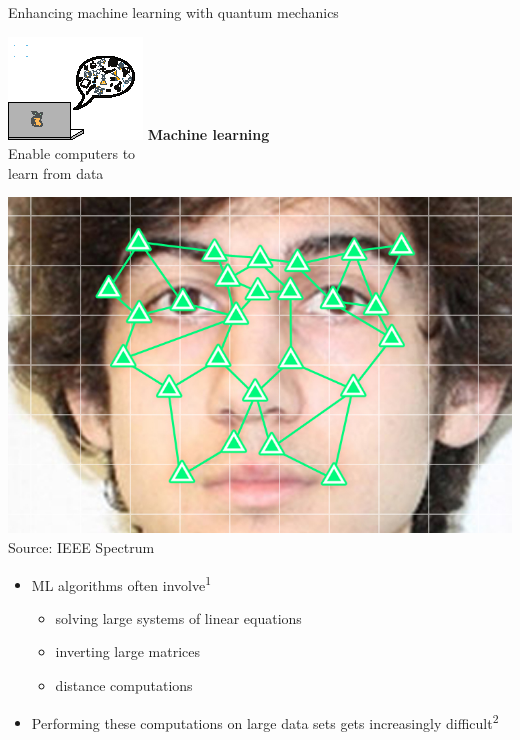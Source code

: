 \documentclass[10pt]{beamer}
\begin{document}
{
\begin{frame}[fragile]{Enhancing machine learning with quantum mechanics}

\begin{minipage}[c]{0.45\textwidth}
\includegraphics[scale=3.5]{Vectors/laptop_ml.eps}
\newline
\textbf{Machine learning}\\
Enable computers to\\
learn from data
\end{minipage}%
\hspace{0.5cm}
\begin{minipage}[c]{0.49\textwidth}
\centering
\includegraphics[scale=0.8]{facial_recognition.jpg}\\
\vspace{-0.2cm}
\tiny{Source: IEEE Spectrum}
\normalsize
\vspace{0.5cm}
\flushleft
\begin{itemize}	 
	\item ML algorithms often involve\textsuperscript{1}
	\begin{itemize}
	\item solving large systems of linear equations
	\item inverting large matrices
	\item distance computations
	\end{itemize}
	\item Performing these computations on large data
sets gets increasingly difficult\textsuperscript{2}
\end{itemize}
\end{minipage}



\end{frame}}
\end{document}
